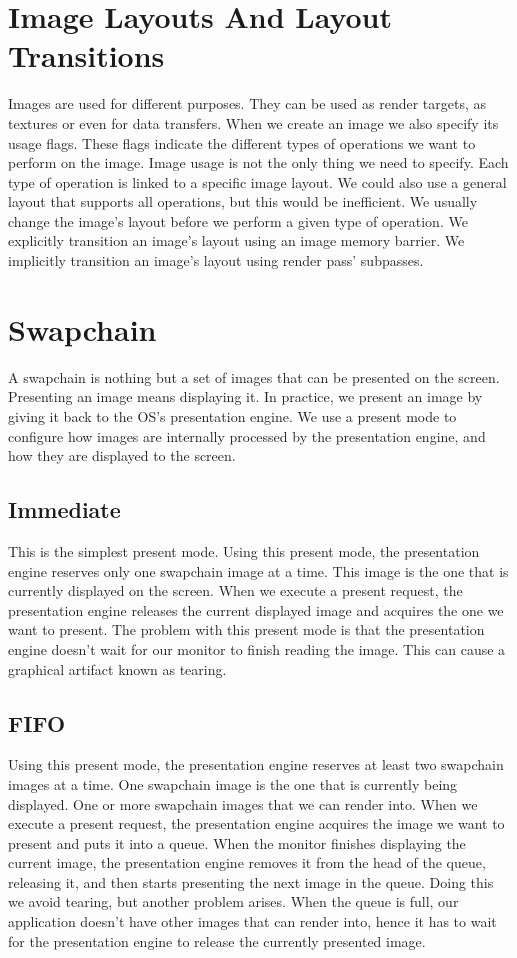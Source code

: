 \section{Image Layouts And Layout Transitions}

Images are used for different purposes.
They can be used as render targets, as textures or even for data transfers.
When we create an image we also specify its usage flags.
These flags indicate the different types of operations we want to perform
on the image.
Image usage is not the only thing we need to specify.
Each type of operation is linked to a specific image layout.
We could also use a general layout that supports all operations, but this
would be inefficient.
We usually change the image's layout before we perform a given type of
operation.
We explicitly transition an image's layout using an image memory barrier.
We implicitly transition an image's layout using render pass' subpasses.

\section{Swapchain}

A swapchain is nothing but a set of images that can be presented on the screen.
Presenting an image means displaying it.
In practice, we present an image by giving it back to the OS's presentation engine.
We use a present mode to configure how images are internally processed by
the presentation engine, and how they are displayed to the screen.

\subsection{Immediate}

This is the simplest present mode.
Using this present mode, the presentation engine reserves only one swapchain
image at a time.
This image is the one that is currently displayed on the screen.
When we execute a present request, the presentation engine releases
the current displayed image and acquires the one we want to present.
The problem with this present mode is that the presentation engine doesn't
wait for our monitor to finish reading the image.
This can cause a graphical artifact known as tearing.

\subsection{FIFO}

Using this present mode, the presentation engine reserves at least two
swapchain images at a time.
One swapchain image is the one that is currently being displayed.
One or more swapchain images that we can render into.
When we execute a present request, the presentation engine acquires
the image we want to present and puts it into a queue.
When the monitor finishes displaying the current image, the presentation engine
removes it from the head of the queue, releasing it, and then starts
presenting the next image in the queue.
Doing this we avoid tearing, but another problem arises.
When the queue is full, our application doesn't have other images that can
render into, hence it has to wait for the presentation engine to release the
currently presented image.

